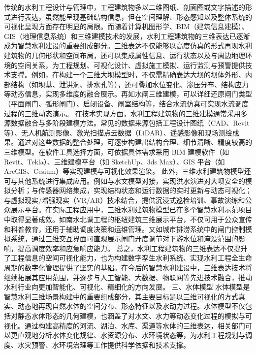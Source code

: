 {{传统的水利工程设计与管理中，工程建筑物多以二维图纸、剖面图或文字描述的形式进行表达，虽然能呈现基础结构信息，但在空间理解、形态感知以及整体系统的可视化呈现方面存在明显的局限。而随着计算机图形学、BIM（建筑信息建模）、GIS（地理信息系统）和三维建模技术的发展，水利工程建筑物的三维表达已逐渐成为智慧水利建设的重要组成部分。三维表达不仅能够以高度仿真的形式再现水利建筑物的几何形状和空间布局，还可以集成属性信息、运行状态以及与周边地理环境的空间关系，为工程规划、可视化设计、虚拟施工模拟、运行监测与预警提供技术支撑。例如，在构建一个三维大坝模型时，不仅需精确表达大坝的坝体外形、内部结构（如坝基、泄洪洞、排水孔等），还可叠加水位变化、渗压分布、结构应力等动态信息，实现多维度的融合展示。再如水闸三维建模，可以详细还原闸门类型（平面闸门、弧形闸门）、启闭设备、闸室结构等，结合水流仿真可实现水流调度过程的三维动态演示。 在技术实现方面，水利工程建筑物的三维建模通常采用多源数据融合与多阶段建模方法。常见的数据来源包括工程设计图纸（CAD、Revit 等）、无人机航测影像、激光扫描点云数据（LiDAR）、遥感影像和现场测绘成果。通过对这些数据的整合处理，可逐步构建出结构合理、细节清晰、精度较高的三维模型。在软件工具选择方面，可依据具体需求采用 BIM 建模软件（如 Revit、Tekla）、三维建模平台（如 SketchUp、3ds Max）、GIS 平台（如 ArcGIS、Cesium）等实现建模与可视化效果渲染。 此外，三维水利建筑物模型还可与其他系统进行集成应用。例如与水文模型对接，实现洪水演进对大坝安全的模拟分析；与传感器网络集成，实现结构状态和运行数据的实时更新与动态可视化；与虚拟现实/增强现实（VR/AR）技术结合，提供沉浸式巡检培训、事故演练和公众展示平台。在实际工程应用中，三维水利建筑物模型已在多个智慧水利示范项目中取得显著成效。如南水北调工程的枢纽建筑三维展示平台，不仅可用于公众宣传和科普教育，还用于辅助调度决策和运维管理。又如城市排涝系统中的闸门控制模拟系统，通过三维交互界面可直观展示闸门开度调节对下游水位和淹没范围的影响，提高调度效率和应急响应能力。 总之，水利工程建筑物的三维表达不仅提升了工程信息的空间可视化能力，也为构建数字孪生水利系统、实现水利工程全生命周期的数字化管理提供了坚实的基础。在今后的智慧水利建设中，三维表达技术将继续拓展其应用范围，并逐步与人工智能、大数据、物联网等先进技术融合，推动水利行业向更加智能化、可视化、精细化的方向发展。 三、水体模型 水体模型是智慧水利三维场景构建中的重要组成部分，其主要目标是以三维可视化的方式真实、动态地再现自然水体的空间分布、形态特征以及水动力过程。水体模型不仅包括对静态水体形态的几何建模，也涵盖了对水文、水力等动态变化过程的模拟与可视化。通过构建高精度的河流、湖泊、水库、渠道等水体的三维表达，相关部门可以更直观地分析水体变化规律、水资源分布、水环境状态等，为水利工程规划与调度、水灾预警、水环境治理等工作提供科学依据和技术支撑。 }}
